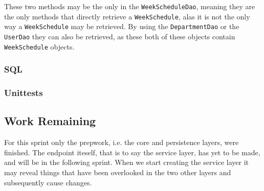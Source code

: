 These two methods may be the only in the \texttt{WeekScheduleDao}, meaning they are the only methods that directly retrieve a \texttt{WeekSchedule}, alas it is not the only way a \texttt{WeekSchedule} may be retrieved.
By using the \texttt{DepartmentDao} or the \texttt{UserDao} they can also be retrieved, as these both of these objects contain \texttt{WeekSchedule} objects.

\subsubsection{SQL}
\subsubsection{Unittests}
\subsection{Work Remaining}
For this sprint only the prepwork, i.e. the core and persistence layers, were finished.
The endpoint iteself, that is to say the service layer, has yet to be made, and will be in the following sprint.
When we start creating the service layer it may reveal things that have been overlooked in the two other layers and subsequently cause changes.

